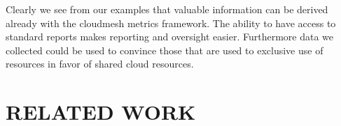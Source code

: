 \documentclass{sig-alternate-05-2015}
\begin{document}
Clearly we see from our examples that valuable information can be derived already with the cloudmesh metrics framework. The ability to have access to standard reports makes reporting and oversight easier. Furthermore data we collected could be used to convince those that are used to exclusive use of resources in favor of shared cloud resources.

\section{RELATED WORK}\label{S:related}
\end{document}
